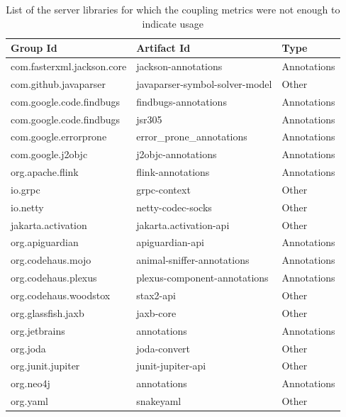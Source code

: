 \begin{table}[ht]
\begin{center}
\begin{tabular}{|l|l|l|}
\hline
\textbf{Group Id} & \textbf{Artifact Id} & \textbf{Type} \\
\hline
com.fasterxml.jackson.core  & jackson-annotations             & Annotations \\\hline
com.github.javaparser       & javaparser-symbol-solver-model  & Other       \\\hline
com.google.code.findbugs    & findbugs-annotations            & Annotations \\\hline
com.google.code.findbugs    & jsr305                          & Annotations \\\hline
com.google.errorprone       & error\_prone\_annotations       & Annotations \\\hline
com.google.j2objc           & j2objc-annotations              & Annotations \\\hline
org.apache.flink            & flink-annotations               & Annotations \\\hline
io.grpc                     & grpc-context                    & Other       \\\hline
io.netty                    & netty-codec-socks               & Other       \\\hline
jakarta.activation          & jakarta.activation-api          & Other       \\\hline
org.apiguardian             & apiguardian-api                 & Annotations \\\hline
org.codehaus.mojo           & animal-sniffer-annotations      & Annotations \\\hline
org.codehaus.plexus         & plexus-component-annotations    & Annotations \\\hline
org.codehaus.woodstox       & stax2-api                       & Other       \\\hline
org.glassfish.jaxb          & jaxb-core                       & Other       \\\hline
org.jetbrains               & annotations                     & Annotations \\\hline
org.joda                    & joda-convert                    & Other       \\\hline
org.junit.jupiter           & junit-jupiter-api               & Other       \\\hline
org.neo4j                   & annotations                     & Annotations \\\hline
org.yaml                    & snakeyaml                       & Other       \\\hline
\end{tabular}
\end{center}
\caption{List of the server libraries for which the coupling metrics were not enough to indicate usage}
\label{table:significance-coupling}
\end{table}

